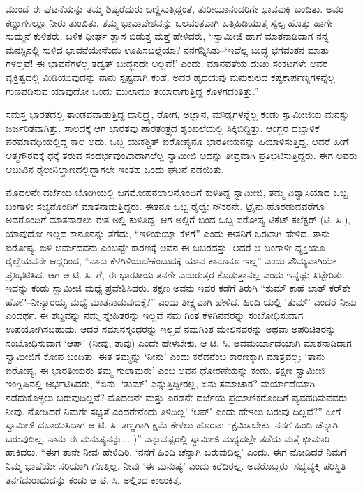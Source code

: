 ಮುಂದೆ ಈ ಘಟನೆಯನ್ನು ತಮ್ಮ ಶಿಷ್ಯರೆದುರು ಬಣ್ಣಿಸುತ್ತಿದ್ದಂತೆ, ತುರೀಯಾನಂದರಿಗೇ ಭಾವವುಕ್ಕಿ ಬಂದಿತು. ಅವರ ಕಣ್ಣುಗಳಲ್ಲೂ ನೀರು ತುಂಬಿತು. ತಮ್ಮ ಭಾವಾವೇಶವನ್ನು ಬಲವಂತವಾಗಿ ಒತ್ತಿಹಿಡಿಯುತ್ತ ಸ್ವಲ್ಪ ಹೊತ್ತು ಹಾಗೇ ಸುಮ್ಮನೆ ಕುಳಿತರು. ಬಳಿಕ ಧೀರ್ಘ ಶ್ವಾಸ ಬಿಡುತ್ತ ಮತ್ತೆ ಹೇಳಿದರು, “ಸ್ವಾಮೀಜಿ ಹಾಗೆ ಮಾತನಾಡಿದಾಗ ನನ್ನ ಮನಸ್ಸಿನಲ್ಲಿ ಸುಳಿದ ಭಾವನೆಯೇನೆಂದು ಊಹಿಸಬಲ್ಲೆಯಾ? ನನಗನ್ನಿಸಿತು–‘ಇವೆಲ್ಲ ಬುದ್ಧ ಭಗವಂತನ ಮಾತು ಗಳಲ್ಲವೆ! ಈ ಭಾವನೆಗಳೆಲ್ಲ ತದ್ವತ್ ಬುದ್ಧನದೇ ಅಲ್ಲವೆ!’ ಎಂದು. ಮಾನವತೆಯ ದುಃಖ ಸಂಕಟಗಳೇ ಅವರ ವ್ಯಕ್ತಿತ್ವದಲ್ಲಿ ಮಿಡಿಯುವುದನ್ನು ನಾನು ಸ್ಪಷ್ಟವಾಗಿ ಕಂಡೆ. ಅವರ ಹೃದಯವು ಮನುಕುಲದ ಕಷ್ಟಕಾರ್ಪಣ್ಯಗಳನ್ನೆಲ್ಲ ಗುಣಪಡಿಸುವ ಯಾವುದೋ ಒಂದು ಮುಲಾಮು ತಯಾರಾಗುತ್ತಿದ್ದ ಕೊಳಗದಂತಿತ್ತು.”

ಸಮಸ್ತ ಭಾರತದಲ್ಲಿ ತಾಂಡವವಾಡುತ್ತಿದ್ದ ದಾರಿದ್ರ್ಯ, ರೋಗ, ಅಜ್ಞಾನ, ಮೌಢ್ಯಗಳನ್ನೆಲ್ಲ ಕಂಡು ಸ್ವಾಮೀಜಿಯ ಮನಸ್ಸು ಜರ್ಜರಿತವಾಗಿತ್ತು. ಸಾಲದಕ್ಕೆ ಆಗ ಭಾರತವು ಪಾರತಂತ್ರ್ಯದ ಶೃಂಖಲೆಯಲ್ಲಿ ಸಿಕ್ಕಿಬಿದ್ದಿತ್ತು. ಆಂಗ್ಲರ ದಬ್ಬಾಳಿಕೆ ಪರಮಾವಧಿಯಲ್ಲಿದ್ದ ಕಾಲ ಅದು. ಒಬ್ಬ ಯಃಕಶ್ಚಿತ್ ಐರೋಪ್ಯನೂ ಭಾರತೀಯನನ್ನು ಹಿಯಾಳಿಸುತ್ತಿದ್ದ. ಆದರೆ ಹೀಗೆ ಆತ್ಮಗೌರವಕ್ಕೆ ಧಕ್ಕೆ ತರುವ ಸಂದರ್ಭವುಂಟಾದಾಗಲೆಲ್ಲ ಸ್ವಾಮೀಜಿ ಅದನ್ನು ತೀವ್ರವಾಗಿ ಪ್ರತಿಭಟಿಸುತ್ತಿದ್ದರು. ಈಗ ಅವರು ಆಬುವಿನ ರೈಲುನಿಲ್ದಾಣದಲ್ಲಿದ್ದಾಗಲೇ ಇಂತಹ ಒಂದು ಘಟನೆ ನಡೆಯಿತು.

ಮೊದಲನೇ ದರ್ಜೆಯ ಬೋಗಿಯಲ್ಲಿ ಜಗಮೋಹನಲಾಲನೊಂದಿಗೆ ಕುಳಿತಿದ್ದ ಸ್ವಾಮೀಜಿ, ತಮ್ಮ ವಿಶ್ವಾಸಿಯಾದ ಒಬ್ಬ ಬಂಗಾಳೀ ಸಭ್ಯನೊಂದಿಗೆ ಮಾತನಾಡುತ್ತಿದ್ದರು. ಈತನೂ ಒಬ್ಬ ರೈಲ್ವೇ ನೌಕರನೇ. ಟ್ರೈನು ಹೊರಡುವವರೆಗೂ ಅವರೊಂದಿಗೆ ಮಾತನಾಡಲು ಈತ ಅಲ್ಲಿ ಕುಳಿತಿದ್ದ. ಆಗ ಅಲ್ಲಿಗೆ ಬಂದ ಒಬ್ಬ ಐರೋಪ್ಯ ಟಿಕೆಟ್ ಕಲೆಕ್ಟರ್ (ಟಿ. ಸಿ.), ಯಾವುದೋ ಇಲ್ಲದ ಕಾನೂನನ್ನು ತೆಗೆದು, “ಇಳಿಯಯ್ಯಾ ಕೆಳಗೆ” ಎಂದು ಈತನಿಗೆ ಒರಟಾಗಿ ಹೇಳಿದ. ತಾನು ಐರೋಪ್ಯ, ಬಿಳಿ ಚರ್ಮದವನು ಎಂಬಷ್ಟೇ ಕಾರಣಕ್ಕೆ ಅವನ ಈ ಜಬರದಸ್ತು. ಆದರೆ ಆ ಬಂಗಾಳೀ ವ್ಯಕ್ತಿಯೂ ರೈಲ್ವೆಯವನೇ ಆದ್ದರಿಂದ, “ನಾನು ಕೆಳಗಿಳಿಯಬೇಕೆಂಬುದಕ್ಕೆ ಯಾವ ಕಾನೂನೂ ಇಲ್ಲ” ಎಂದು ಸೌಮ್ಯವಾಗಿಯೇ ಪ್ರತಿಭಟಿಸಿದ. ಆಗ ಆ ಟಿ. ಸಿ. ಗೆ, ಈ ಭಾರತೀಯ ತನಗೇ ಎದುರುತ್ತರ ಕೊಡುತ್ತಾನಲ್ಲ ಎಂದು ಇನ್ನಷ್ಟು ಸಿಟ್ಟೇರಿತು. ಇದನ್ನು ಕಂಡು ಸ್ವಾಮೀಜಿ ಮಧ್ಯೆ ಪ್ರವೇಶಿಸಿದರು. ತಕ್ಷಣ ಅವನು ಇವರ ಕಡೆಗೆ ತಿರುಗಿ “ತುಮ್ ಕಾಹೆ ಬಾತ್ ಕರ್​ತೇ ಹೋ?–ನೀನ್ಯಾರಯ್ಯ ಮಧ್ಯೆ ಮಾತನಾಡುವುದಕ್ಕೆ?” ಎಂದು ತೀಕ್ಷ್ಣವಾಗಿ ಹೇಳಿದ. ಹಿಂದಿ ಯಲ್ಲಿ ‘ತುಮ್​’ ಎಂದರೆ ನೀನು ಎಂದರ್ಥ. ಈ ಶಬ್ದವನ್ನು ನಮ್ಮ ಸ್ನೇಹಿತರನ್ನು ಇಲ್ಲವೆ ನಮ ಗಿಂತ ಕೆಳಗಿನವರನ್ನು ಸಂಬೋಧಿಸುವಾಗ ಉಪಯೋಗಿಸಬಹುದು. ಆದರೆ ಸಮಾನಸ್ಕಂಧರನ್ನು ಇಲ್ಲವೆ ನಮಗಿಂತ ಮೇಲಿನವರನ್ನು ಅಥವಾ ಅಪರಿಚಿತರನ್ನು ಸಂಬೋಧಿಸುವಾಗ ‘ಆಪ್​’ (ನೀವು, ತಾವು) ಎಂದೇ ಹೇಳಬೇಕು. ಆ ಟಿ. ಸಿ. ಅವಮರ್ಯಾದೆಯಾಗಿ ಮಾತನಾಡಿದಾಗ ಸ್ವಾಮೀಜಿಗೆ ಕೋಪ ಬಂದಿತು. ಈತ ತಮ್ಮನ್ನು ‘ನೀನು’ ಎಂದು ಕರೆದನೆಂಬ ಕಾರಣಕ್ಕಾಗಿ ಮಾತ್ರವಲ್ಲ; ‘ತಾನು ಐರೋಪ್ಯ, ಈ ಭಾರತೀಯರು ತಮ್ಮ ಗುಲಾಮರು’ ಎಂಬ ಅವನ ಧೋರಣೆಯನ್ನು ಕಂಡು. ತಕ್ಷಣ ಸ್ವಾಮೀಜಿ ಇಂಗ್ಲಿಷಿನಲ್ಲಿ ಆರ್ಭಟಿಸಿದರು, “ಏನು, ‘ತುಮ್​’ ಎನ್ನುತ್ತಿದ್ದೀರಲ್ಲ, ಏನು ಸಮಾಚಾರ? ಮರ್ಯಾದೆಯಾಗಿ ನಡೆದುಕೊಳ್ಳಲು ಬರುವುದಿಲ್ಲವೆ? ಮೊದಲನೇ ಮತ್ತು ಎರಡನೇ ದರ್ಜೆಯ ಪ್ರಯಾಣಿಕರೊಂದಿಗೆ ವ್ಯವಹರಿಸುವವರು ನೀವು. ನೋಡಿದರೆ ನಿಮಗೇ ಸಭ್ಯತೆ ಎಂದರೇನೆಂದು ತಿಳಿದಿಲ್ಲ! ‘ಆಪ್​’ ಎಂದು ಹೇಳಲು ಬರುವು ದಿಲ್ಲವೆ?” ಹೀಗೆ ಸ್ವಾಮೀಜಿ ದಬಾಯಿಸಿದಾಗ ಆ ಟಿ. ಸಿ. ತಣ್ಣಗಾಗಿ ಕ್ಷಮೆ ಕೇಳಲು ಹೊರಟ: “ಕ್ಷಮಿಸಬೇಕು. ನನಗೆ ಹಿಂದಿ ಚೆನ್ನಾಗಿ ಬರುವುದಿಲ್ಲ. ನಾನು ಈ ಮನುಷ್ಯನನ್ನು... )” ಎನ್ನುವಷ್ಟರಲ್ಲಿ ಸ್ವಾಮೀಜಿ ಮಧ್ಯದಲ್ಲೇ ತಡೆದು ಮತ್ತೆ ಛೀಮಾರಿ ಹಾಕಿದರು. “ಈಗ ತಾನೇ ನೀವು ಹೇಳಿದಿರಿ, ‘ನನಗೆ ಹಿಂದಿ ಚೆನ್ನಾಗಿ ಬರುವುದಿಲ್ಲ’ ಎಂದು. ಈಗ ನೋಡಿದರೆ ನಿಮಗೆ ನಿಮ್ಮ ಭಾಷೆಯೇ ಸರಿಯಾಗಿ ಗೊತ್ತಿಲ್ಲ. ನೀವು ‘ಈ ಮನುಷ್ಯ’ ಎಂದು ಕರೆದಿರಲ್ಲ. ಅವರೊಬ್ಬರು ‘ಸಭ್ಯವ್ಯಕ್ತಿ ಪರಿಸ್ಥಿತಿ ತನಗೆದುರಾದುದನ್ನು ಕಂಡು ಆ ಟಿ. ಸಿ. ಅಲ್ಲಿಂದ ಕಾಲುಕಿತ್ತ.

